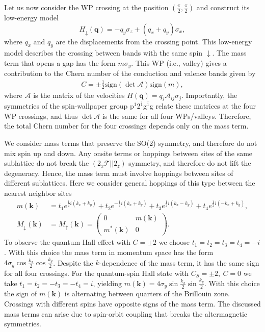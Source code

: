 \documentclass[aps,preprintnumbers,amsmath,amssymb]{revtex4-2}
\begin{document}
Let us now consider the WP crossing at the position $(\tfrac{\pi}{2}, \tfrac{\pi}{2})$ and construct its low-energy model
\begin{equation}\label{low_en_model}
    H_{\downarrow}(\mathbf{q}) = -q_y\sigma_z + (q_x +q_y)\sigma_x,
\end{equation}
where $q_x$ and $q_y$ are the displacements from the crossing point. This low-energy model describes the crossing between bands with the same spin $\downarrow$. The mass term that opens a gap has the form $m\sigma_y$. This WP (i.e., valley) gives a contribution to the Chern number of the conduction and valence bands given by
\begin{align}
    C = \pm \tfrac{1}{2} \text{sign} (\det \mathcal{A}) \text{sign} (m),
\end{align}
where $\mathcal{A}$ is the matrix of the velocities $H(\mathbf{q}) = q_i \mathcal{A}_{ij}\sigma_j$. 
Importantly, the symmetries of the spin-wallpaper group 
p$^1$2$^{\overline{1}}$g$^{\overline{1}}$g relate these matrices at the four WP crossings, and thus $\det \mathcal{A}$ is the same for all four WPs/valleys. Therefore, the total Chern number for the four crossings depends only on the mass term.

We consider mass terms that preserve the SO(2) symmetry, and therefore do not mix spin up and down. Any onsite terms or hoppings between sites 
of the same sublattice do not break the $(2_x\mathcal{T}||2_z)$ symmetry, and therefore do not lift the degeneracy. 
Hence, the mass term must involve hoppings between sites 
of different sublattices. Here we consider general hoppings of this type between the nearest neighbor sites
\begin{align}
    m(\mathbf{k}) &= t_1 e^{\frac{1}{2} i (k_x+k_y)}+t_2 e^{-\frac{1}{2} i (k_x+k_y)}
    +t_3 e^{\frac{1}{2} i (k_x-k_y)}+t_4 e^{\frac{1}{2} i (-k_x+k_y)},\\
    M_{\downarrow}(\mathbf{k}) &= M_{\uparrow}(\mathbf{k}) = \begin{pmatrix}
        0&m(\mathbf{k})\\
        m^*(\mathbf{k})&0
    \end{pmatrix}.
\end{align}
To observe the quantum Hall effect with $C=\pm2$ we choose $t_1=t_2=t_3=t_4=-i$. With this choice the mass term in momentum space has the form $4 \sigma_y\cos\tfrac{k_x}{2} \cos\tfrac{k_y}{2}$. Despite the $k$-dependence of the mass term, it has the same sign for all four crossings. 
For the quantum-spin Hall state with $C_S = \pm2, \ C = 0$ we take $t_1=t_2=-t_3=-t_4=i$,  yielding $m (\mathbf{k} ) = 4 \sigma_y\sin\tfrac{k_x}{2} \sin\tfrac{k_y}{2}$. With this choice the sign of $m (\mathbf{k} )$ is alternating between quarters of the Brillouin zone. Crossings with different spins have opposite signs of the mass term. The discussed mass terms can arise due to spin-orbit coupling that breaks the altermagnetic symmetries.
\end{document}
